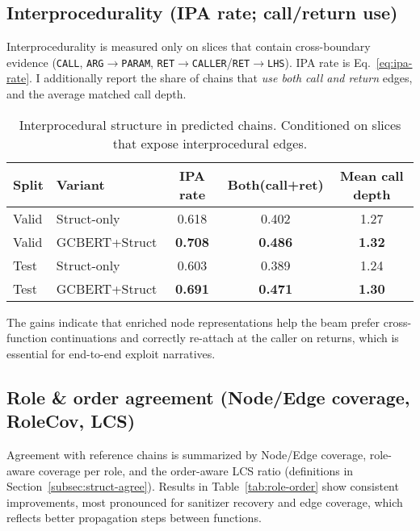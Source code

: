 \documentclass{buthesis}
\begin{document}
\subsection{Interprocedurality (IPA rate; call/return use)}
\label{sec:results-ipa}

Interprocedurality is measured only on slices that contain cross-boundary evidence (\texttt{CALL}, \texttt{ARG}\(\to\)\texttt{PARAM}, \texttt{RET}\(\to\)\texttt{CALLER}/\texttt{RET}\(\to\)\texttt{LHS}). IPA rate is Eq.~\eqref{eq:ipa-rate}. I additionally report the share of chains that \emph{use both call and return} edges, and the average matched call depth.

\begin{table}[H]
\centering
\small
\setlength{\tabcolsep}{6pt}
\renewcommand{\arraystretch}{1.10}
\caption{Interprocedural structure in predicted chains. Conditioned on slices that expose interprocedural edges.}
\label{tab:ipa}
\begin{tabular}{l l c c c}
\toprule
\textbf{Split} & \textbf{Variant} & \textbf{IPA rate} & \textbf{Both(call+ret)} & \textbf{Mean call depth} \\
\midrule
Valid & Struct-only        & 0.618 & 0.402 & 1.27 \\
Valid & GCBERT{+}Struct   & \textbf{0.708} & \textbf{0.486} & \textbf{1.32} \\
Test  & Struct-only        & 0.603 & 0.389 & 1.24 \\
Test  & GCBERT{+}Struct   & \textbf{0.691} & \textbf{0.471} & \textbf{1.30} \\
\bottomrule
\end{tabular}
\end{table}

\noindent
The gains indicate that enriched node representations help the beam prefer cross-function continuations and correctly re-attach at the caller on returns, which is essential for end-to-end exploit narratives.

\subsection{Role \& order agreement (Node/Edge coverage, RoleCov, LCS)}
\label{sec:results-role-order}

Agreement with reference chains is summarized by Node/Edge coverage, role-aware coverage per role, and the order-aware LCS ratio (definitions in Section~\ref{subsec:struct-agree}). Results in Table~\ref{tab:role-order} show consistent improvements, most pronounced for sanitizer recovery and edge coverage, which reflects better propagation steps between functions.
\end{document}
